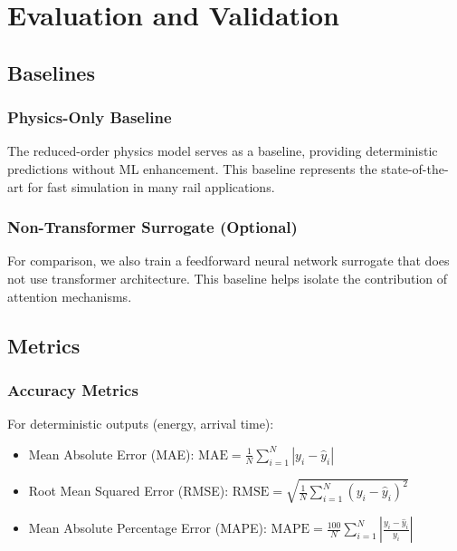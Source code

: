 \chapter{Evaluation and Validation}
\label{ch:eval}

\section{Baselines}

\subsection{Physics-Only Baseline}

The reduced-order physics model serves as a baseline, providing deterministic predictions without ML enhancement. This baseline represents the state-of-the-art for fast simulation in many rail applications.


\subsection{Non-Transformer Surrogate (Optional)}

For comparison, we also train a feedforward neural network surrogate that does not use transformer architecture. This baseline helps isolate the contribution of attention mechanisms.


\section{Metrics}

\subsection{Accuracy Metrics}

For deterministic outputs (energy, arrival time):
\begin{itemize}
    \item Mean Absolute Error (MAE): $\text{MAE} = \frac{1}{N} \sum_{i=1}^N |y_i - \hat{y}_i|$
    \item Root Mean Squared Error (RMSE): $\text{RMSE} = \sqrt{\frac{1}{N} \sum_{i=1}^N (y_i - \hat{y}_i)^2}$
    \item Mean Absolute Percentage Error (MAPE): $\text{MAPE} = \frac{100}{N} \sum_{i=1}^N \left|\frac{y_i - \hat{y}_i}{y_i}\right|$
\end{itemize}

